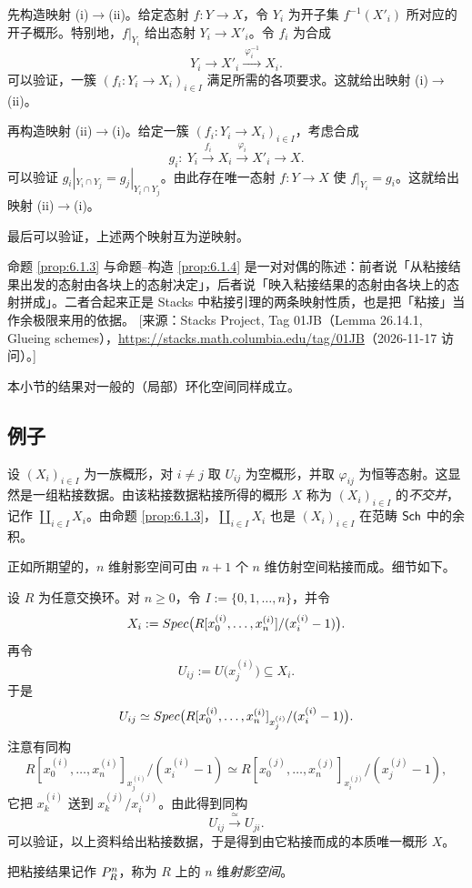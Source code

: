 \begin{proofsketch}
先构造映射 (i)$\to$(ii)。给定态射 $f:Y\to X$，令 $Y_i$ 为开子集 $f^{-1}(X'_i)$ 所对应的开子概形。特别地，$f|_{Y_i}$ 给出态射 $Y_i\to X'_i$。令 $f_i$ 为合成
\[
Y_i\to X'_i\xrightarrow{\ \varphi_i^{-1}\ }X_i .
\]
可以验证，一簇 $(f_i:Y_i\to X_i)_{i\in I}$ 满足所需的各项要求。这就给出映射 (i)$\to$(ii)。

再构造映射 (ii)$\to$(i)。给定一簇 $(f_i:Y_i\to X_i)_{i\in I}$，考虑合成
\[
g_i:\ Y_i\xrightarrow{\ f_i\ }X_i\xrightarrow{\ \varphi_i\ }X'_i\to X .
\]
可以验证 $g_i|_{Y_i\cap Y_j}=g_j|_{Y_i\cap Y_j}$。由此存在唯一态射 $f:Y\to X$ 使 $f|_{Y_i}=g_i$。这就给出映射 (ii)$\to$(i)。

最后可以验证，上述两个映射互为逆映射。
\end{proofsketch}

\begin{yizhu}
命题 \ref{prop:6.1.3} 与命题--构造 \ref{prop:6.1.4} 是一对对偶的陈述：前者说「从粘接结果出发的态射由各块上的态射决定」，后者说「映入粘接结果的态射由各块上的态射拼成」。二者合起来正是 Stacks 中粘接引理的两条映射性质，也是把「粘接」当作余极限来用的依据。
[来源：Stacks Project, Tag 01JB（Lemma 26.14.1, Glueing schemes），\url{https://stacks.math.columbia.edu/tag/01JB}（2026-11-17 访问）。]
\end{yizhu}

\begin{remark}\label{rem:6.1.5}
本小节的结果对一般的（局部）环化空间同样成立。
\end{remark}

\subsection{例子}\label{sec:6.2}

\begin{example}\label{ex:6.2.1}
设 $(X_i)_{i\in I}$ 为一族概形，对 $i\neq j$ 取 $U_{ij}$ 为空概形，并取 $\varphi_{ij}$ 为恒等态射。这显然是一组粘接数据。由该粘接数据粘接所得的概形 $X$ 称为 $(X_i)_{i\in I}$ 的\emph{不交并}，记作 $\coprod_{i\in I}X_i$。由命题 \ref{prop:6.1.3}，$\coprod_{i\in I}X_i$ 也是 $(X_i)_{i\in I}$ 在范畴 $\mathsf{Sch}$ 中的余积。
\end{example}

\begin{example}\label{ex:6.2.2}
正如所期望的，$n$ 维射影空间可由 $n+1$ 个 $n$ 维仿射空间粘接而成。细节如下。

设 $R$ 为任意交换环。对 $n\ge 0$，令 $I:=\{0,1,\dots,n\}$，并令
\[
X_i:=Spec\bigl(R[x_0^{(i)},\dots,x_n^{(i)}]/(x_i^{(i)}-1)\bigr).
\]
再令
\[
U_{ij}:=U\bigl(x_j^{(i)}\bigr)\subseteq X_i .
\]
于是
\[
U_{ij}\simeq Spec\bigl(R[x_0^{(i)},\dots,x_n^{(i)}]_{x_j^{(i)}}/(x_i^{(i)}-1)\bigr).
\]
注意有同构
\[
R[x_0^{(i)},\dots,x_n^{(i)}]_{x_j^{(i)}}/(x_i^{(i)}-1)
\simeq
R[x_0^{(j)},\dots,x_n^{(j)}]_{x_i^{(j)}}/(x_j^{(j)}-1),
\]
它把 $x_k^{(i)}$ 送到 $x_k^{(j)}/x_i^{(j)}$。由此得到同构
\[
U_{ij}\xrightarrow{\ \simeq\ }U_{ji}.
\]
可以验证，以上资料给出粘接数据，于是得到由它粘接而成的本质唯一概形 $X$。

把粘接结果记作 $P^n_R$，称为 $R$ 上的 $n$ 维\emph{射影空间}。
\end{example}

